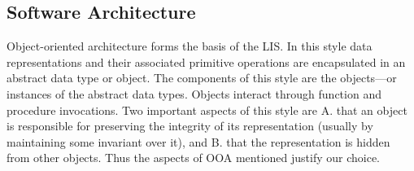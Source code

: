 \documentclass[a4paper]{article}
\begin{document}
\subsection{Software Architecture}
Object-oriented architecture forms the basis of the LIS. In this style data representations and
their associated primitive operations are encapsulated in an abstract data type or object. The components of this style are the objects—or instances of the abstract data types. Objects interact through function and procedure invocations.
Two important aspects of this style are
A. that an object is responsible for preserving the integrity of its representation (usually by
maintaining some invariant over it), and
B. that the representation is hidden from other objects.
Thus the aspects of OOA mentioned justify our choice.
\end{document}
